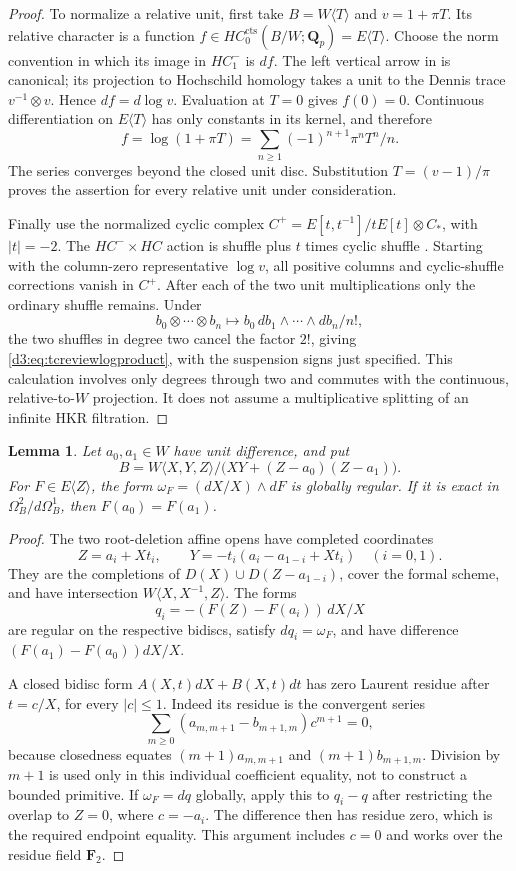 \documentclass[11pt,a4paper]{amsart}
\numberwithin{equation}{section}
\newtheorem{lemma}[theorem]{Lemma}
\theoremstyle{definition}
\theoremstyle{remark}
\begin{document}
\begin{proof}
To normalize a relative unit, first take $B=W\langle T\rangle$ and
$v=1+\pi T$. Its relative character is a function
$f\in HC_0^{\mathrm{cts}}(B/W;\mathbf Q_p)=E\langle T\rangle$.
Choose the norm convention in which its image in $HC^-_1$ is $df$.
The left vertical arrow in \cite[Theorem~2.12]{AMMN} is canonical;
its projection to Hochschild homology takes a unit to the Dennis trace
$v^{-1}\otimes v$. Hence $df=d\log v$. Evaluation at $T=0$ gives
$f(0)=0$. Continuous differentiation on $E\langle T\rangle$ has
only constants in its kernel, and therefore
\[
 f=\log(1+\pi T)=\sum_{n\ge1}(-1)^{n+1}\pi^nT^n/n.
\]
The series converges beyond the closed unit disc. Substitution
$T=(v-1)/\pi$ proves the assertion for every relative unit under
consideration.

Finally use the normalized cyclic complex
$C^+=E[t,t^{-1}]/tE[t]\otimes C_*$, with $|t|=-2$.
The $HC^-\times HC$ action is shuffle plus $t$ times cyclic shuffle
\cite[Definition~2.1 and Remark~2.2]{BokstedtOttosen}.
Starting with the column-zero representative $\log v$, all positive
columns and cyclic-shuffle corrections vanish in $C^+$. After each
of the two unit multiplications only the ordinary shuffle remains.
Under
\[
 b_0\otimes\cdots\otimes b_n\longmapsto
       b_0\,db_1\wedge\cdots\wedge db_n/n!,
\]
the two shuffles in degree two cancel the factor $2!$, giving
\eqref{d3:eq:tcreviewlogproduct}, with the suspension signs just specified.
This calculation involves only degrees through two and commutes with
the continuous, relative-to-$W$ projection. It does not assume a
multiplicative splitting of an infinite HKR filtration.
\end{proof}

\begin{lemma}
\label{d3:lem:tcreviewresidue}
Let $a_0,a_1\in W$ have unit difference, and put
\[
 B=W\langle X,Y,Z\rangle/
           \bigl(XY+(Z-a_0)(Z-a_1)\bigr).
\]
For $F\in E\langle Z\rangle$, the form
$\omega_F=(dX/X)\wedge dF$ is globally regular. If it is exact in
$\Omega_B^2/d\Omega_B^1$, then $F(a_0)=F(a_1)$.
\end{lemma}
\begin{proof}
The two root-deletion affine opens have completed coordinates
\[
 Z=a_i+Xt_i,\qquad
 Y=-t_i(a_i-a_{1-i}+Xt_i)\quad(i=0,1).
\]
They are the completions of $D(X)\cup D(Z-a_{1-i})$, cover the formal
scheme, and have intersection $W\langle X,X^{-1},Z\rangle$.
The forms
\[
 q_i=-(F(Z)-F(a_i))\,dX/X
\]
are regular on the respective bidiscs, satisfy $dq_i=\omega_F$, and
have difference $(F(a_1)-F(a_0))dX/X$.

A closed bidisc form $A(X,t)dX+B(X,t)dt$ has zero Laurent residue
after $t=c/X$, for every $|c|\le1$. Indeed its residue is the
convergent series
\[
 \sum_{m\ge0}(a_{m,m+1}-b_{m+1,m})c^{m+1}=0,
\]
because closedness equates $(m+1)a_{m,m+1}$ and
$(m+1)b_{m+1,m}$. Division by $m+1$ is used only in this individual
coefficient equality, not to construct a bounded primitive.
If $\omega_F=dq$ globally, apply this to $q_i-q$ after restricting
the overlap to $Z=0$, where $c=-a_i$. The difference then has residue
zero, which is the required endpoint equality. This argument includes
$c=0$ and works over the residue field $\mathbf F_2$.
\end{proof}
\end{document}
